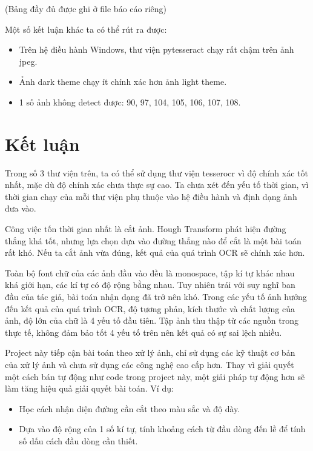 \documentclass[12pt,a4paper]{article}
\begin{document}
(Bảng đầy đủ được ghi ở file báo cáo riêng)

\noindent Một số kết luận khác ta có thể rút ra được:

\begin{itemize}
	\item Trên hệ điều hành Windows, thư viện pytesseract chạy rất chậm trên ảnh jpeg.
	\item Ảnh dark theme chạy ít chính xác hơn ảnh light theme.
	\item 1 số ảnh không detect được: 90, 97, 104, 105, 106, 107, 108.
\end{itemize}

\section{Kết luận}

\indent Trong số 3 thư viện trên, ta có thể sử dụng thư viện tesserocr vì độ chính xác tốt nhất, mặc dù độ chính xác chưa thực sự cao. Ta chưa xét đến yếu tố thời gian, vì thời gian chạy của mỗi thư viện phụ thuộc vào hệ điều hành và định dạng ảnh đưa vào.

Công việc tốn thời gian nhất là cắt ảnh. Hough Transform phát hiện đường thẳng khá tốt, nhưng lựa chọn dựa vào đường thẳng nào để cắt là một bài toán rất khó. Nếu ta cắt ảnh vừa đúng, kết quả của quá trình OCR sẽ chính xác hơn.

Toàn bộ font chữ của các ảnh đầu vào đều là monospace, tập kí tự khác nhau khá giới hạn, các kí tự có độ rộng bằng nhau. Tuy nhiên trái với suy nghĩ ban đầu của tác giả, bài toán nhận dạng đã trở nên khó. Trong các yếu tố ảnh hưởng đến kết quả của quá trình OCR, độ tương phản, kích thước và chất lượng của ảnh, độ lớn của chữ là 4 yếu tố đầu tiên. Tập ảnh thu thập từ các nguồn trong thực tế, không đảm bảo tốt 4 yếu tố trên nên kết quả có sự sai lệch nhiều.

Project này tiếp cận bài toán theo xử lý ảnh, chỉ sử dụng các kỹ thuật cơ bản của xử lý ảnh và chưa sử dụng các công nghệ cao cấp hơn. Thay vì giải quyết một cách bán tự động như code trong project này, một giải pháp tự động hơn sẽ làm tăng hiệu quả giải quyết bài toán. Ví dụ:

\begin{itemize}
	\item Học cách nhận diện đường cần cắt theo màu sắc và độ dày.
	\item Dựa vào độ rộng của 1 số kí tự, tính khoảng cách từ đầu dòng đến lề để tính số dấu cách đầu dòng cần thiết.
\end{itemize}
\end{document}
